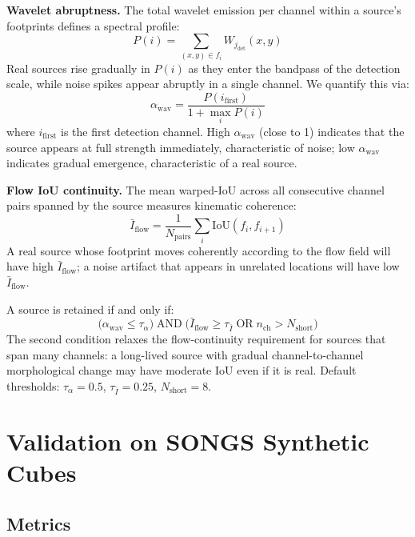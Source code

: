 \documentclass{aa}
\begin{document}
\textbf{Wavelet abruptness.} The total wavelet emission per channel within a source's footprints defines a spectral profile:
\begin{equation}
  P(i) = \sum_{(x,y) \in f_i} W_{j_{\mathrm{det}}}(x,y)
\end{equation}
Real sources rise gradually in $P(i)$ as they enter the bandpass of the detection scale, while noise spikes appear abruptly in a single channel. We quantify this via:
\begin{equation}
  \alpha_{\mathrm{wav}} = \frac{P(i_{\mathrm{first}})}{1 + \max_i P(i)}
\end{equation}
where $i_{\mathrm{first}}$ is the first detection channel. High $\alpha_{\mathrm{wav}}$ (close to 1) indicates that the source appears at full strength immediately, characteristic of noise; low $\alpha_{\mathrm{wav}}$ indicates gradual emergence, characteristic of a real source.

\textbf{Flow IoU continuity.} The mean warped-IoU across all consecutive channel pairs spanned by the source measures kinematic coherence:
\begin{equation}
  \bar{I}_{\mathrm{flow}} = \frac{1}{N_{\mathrm{pairs}}} \sum_{i} \mathrm{IoU}(f_i, f_{i+1})
\end{equation}
A real source whose footprint moves coherently according to the flow field will have high $\bar{I}_{\mathrm{flow}}$; a noise artifact that appears in unrelated locations will have low $\bar{I}_{\mathrm{flow}}$.

A source is retained if and only if:
\begin{equation}
  \bigl(\alpha_{\mathrm{wav}} \leq \tau_{\alpha}\bigr) \;\mathrm{AND}\; \bigl(\bar{I}_{\mathrm{flow}} \geq \tau_{\bar{I}} \;\mathrm{OR}\; n_{\mathrm{ch}} > N_{\mathrm{short}}\bigr)
\end{equation}
The second condition relaxes the flow-continuity requirement for sources that span many channels: a long-lived source with gradual channel-to-channel morphological change may have moderate IoU even if it is real. Default thresholds: $\tau_{\alpha} = 0.5$, $\tau_{\bar{I}} = 0.25$, $N_{\mathrm{short}} = 8$.

\section{Validation on SONGS Synthetic Cubes}
\label{sec:validation}

\subsection{Metrics}
\label{sec:validation_metrics}
\end{document}
